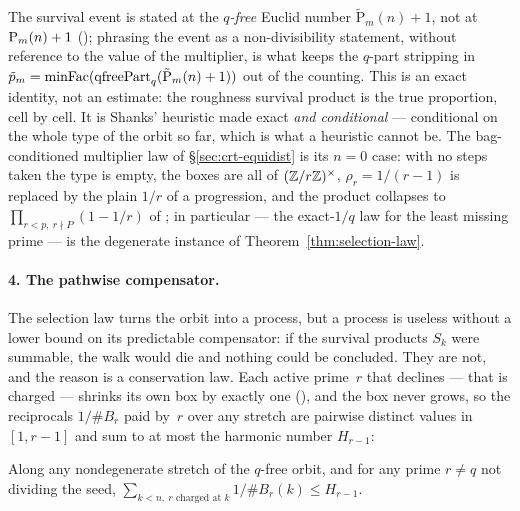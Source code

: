 \noindent The survival event is stated at the \emph{$q$-free} Euclid number
$\tilde{\mathrm{P}}_m(n)+1$, not at $\mathrm{P}_{m}(n)+1$
(); phrasing the event
as a non-divisibility statement, without reference to the value of the
multiplier, is what keeps the $q$-part stripping in
$\tilde p_m = \mathrm{minFac}(\mathrm{qfreePart}_q(\tilde{\mathrm{P}}_m(n)+1))$ out
of the counting.  This is an exact identity, not an estimate: the roughness
survival product is the true proportion, cell by cell.  It is Shanks' heuristic made exact
\emph{and conditional} --- conditional on the whole type of the orbit so
far, which is what a heuristic cannot be.  The bag-conditioned multiplier law of
\S\ref{sec:crt-equidist} is its $n=0$ case: with no steps taken the type is
empty, the boxes are all of $(\mathbb{Z}/r\mathbb{Z})^\times$, $\rho_r = 1/(r-1)$ is
replaced by the plain $1/r$ of a progression, and the product collapses to
$\prod_{r<p,\ r\nmid P}(1-1/r)$ of
;
in particular 
--- the exact-$1/q$ law for the least missing prime --- is the degenerate
instance of Theorem~\ref{thm:selection-law}.

\paragraph{4.  The pathwise compensator.}
The selection law turns the orbit into a process, but a process is useless
without a lower bound on its predictable compensator: if the survival
products $S_k$ were summable, the walk would die and nothing could be
concluded.  They are not, and the reason is a conservation law.  Each
active prime~$r$ that declines --- that is charged --- shrinks its own box
by exactly one
(),
and the box never grows, so the reciprocals $1/\#B_r$ paid by~$r$ over any
stretch are pairwise distinct values in $[1,r-1]$ and sum to at most the
harmonic number $H_{r-1}$:

\begin{lemma}
Along any nondegenerate stretch of the $q$-free orbit, and for any prime
$r \neq q$ not dividing the seed,
$\sum_{k<n,\ r \text{ charged at } k} 1/\#B_r(k) \leq H_{r-1}$.
\end{lemma}

